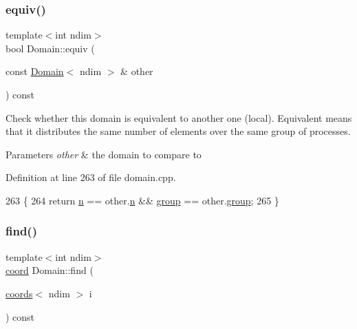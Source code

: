 \subsubsection{\texorpdfstring{equiv()}{equiv()}}
{\footnotesize\ttfamily template$<$int ndim$>$ \\
bool Domain\+::equiv (\begin{DoxyParamCaption}\item[{const \hyperlink{classshark_1_1ndim_1_1_domain}{Domain}$<$ ndim $>$ \&}]{other }\end{DoxyParamCaption}) const}

Check whether this domain is equivalent to another one (local). Equivalent means that it distributes the same number of elements over the same group of processes. 
\begin{DoxyParams}{Parameters}
{\em other} & the domain to compare to \\
\hline
\end{DoxyParams}


Definition at line 263 of file domain.\+cpp.


\begin{DoxyCode}
263                                                         \{
264     \textcolor{keywordflow}{return} \hyperlink{classshark_1_1ndim_1_1_domain_ab942ffcf99c5ee0f2589c8b9104abcfd}{n} == other.\hyperlink{classshark_1_1ndim_1_1_domain_ab942ffcf99c5ee0f2589c8b9104abcfd}{n} && \hyperlink{classshark_1_1ndim_1_1_domain_a2bbf100371762ce405efd218bc1e3d0f}{group} == other.\hyperlink{classshark_1_1ndim_1_1_domain_a2bbf100371762ce405efd218bc1e3d0f}{group};
265 \}
\end{DoxyCode}
\hypertarget{classshark_1_1ndim_1_1_domain_a027c9dbe5aa9fa2fd110c6fb4c62450f}{}\label{classshark_1_1ndim_1_1_domain_a027c9dbe5aa9fa2fd110c6fb4c62450f} 
\subsubsection{\texorpdfstring{find()}{find()}\hspace{0.1cm}{\footnotesize\ttfamily [1/2]}}
{\footnotesize\ttfamily template$<$int ndim$>$ \\
\hyperlink{namespaceshark_a767a92d5dd82cb82266473bff42fa6d9}{coord} Domain\+::find (\begin{DoxyParamCaption}\item[{\hyperlink{structshark_1_1ndim_1_1coords}{coords}$<$ ndim $>$}]{i }\end{DoxyParamCaption}) const}

